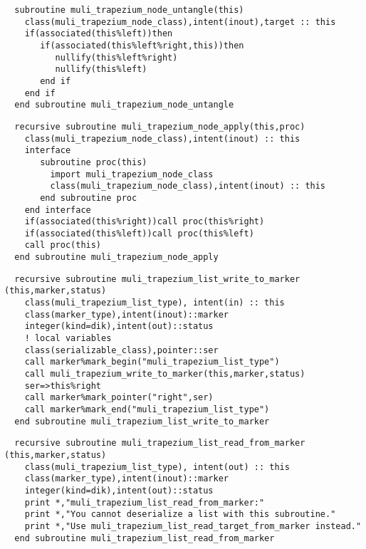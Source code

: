 \begin{Verbatim}
  subroutine muli_trapezium_node_untangle(this)
    class(muli_trapezium_node_class),intent(inout),target :: this
    if(associated(this%left))then
       if(associated(this%left%right,this))then
          nullify(this%left%right)
          nullify(this%left)
       end if
    end if    
  end subroutine muli_trapezium_node_untangle
\end{Verbatim}

\begin{Verbatim}
  recursive subroutine muli_trapezium_node_apply(this,proc)
    class(muli_trapezium_node_class),intent(inout) :: this
    interface
       subroutine proc(this)
         import muli_trapezium_node_class
         class(muli_trapezium_node_class),intent(inout) :: this
       end subroutine proc
    end interface
    if(associated(this%right))call proc(this%right)
    if(associated(this%left))call proc(this%left)
    call proc(this)
  end subroutine muli_trapezium_node_apply
\end{Verbatim}
\begin{Verbatim}
  recursive subroutine muli_trapezium_list_write_to_marker (this,marker,status)
    class(muli_trapezium_list_type), intent(in) :: this
    class(marker_type),intent(inout)::marker
    integer(kind=dik),intent(out)::status 
    ! local variables
    class(serializable_class),pointer::ser
    call marker%mark_begin("muli_trapezium_list_type")
    call muli_trapezium_write_to_marker(this,marker,status)   
    ser=>this%right
    call marker%mark_pointer("right",ser)
    call marker%mark_end("muli_trapezium_list_type")
  end subroutine muli_trapezium_list_write_to_marker
\end{Verbatim}

\begin{Verbatim}
  recursive subroutine muli_trapezium_list_read_from_marker (this,marker,status)
    class(muli_trapezium_list_type), intent(out) :: this
    class(marker_type),intent(inout)::marker
    integer(kind=dik),intent(out)::status
    print *,"muli_trapezium_list_read_from_marker:"
    print *,"You cannot deserialize a list with this subroutine."
    print *,"Use muli_trapezium_list_read_target_from_marker instead."    
  end subroutine muli_trapezium_list_read_from_marker
\end{Verbatim}

